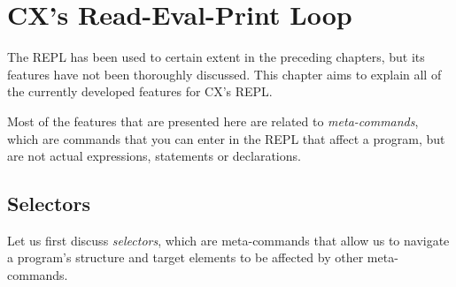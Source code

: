 \documentclass[11pt,fleqn,openany]{book} %
\begin{document}
\chapter{CX's Read-Eval-Print Loop}
\label{chapter:mastering-the-repl}


The REPL has been used to certain extent in the preceding chapters, but its features have not been thoroughly discussed. This chapter aims to explain all of the currently developed features for CX's REPL.

Most of the features that are presented here are related to \emph{meta-commands}, which are commands that you can enter in the REPL that affect a program, but are not actual expressions, statements or declarations.

\section{Selectors}

Let us first discuss \emph{selectors}, which are meta-commands that allow us to navigate a program's structure and target elements to be affected by other meta-commands.
\end{document}
